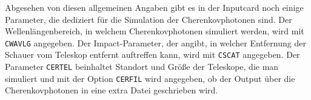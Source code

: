 Abgesehen von diesen allgemeinen Angaben gibt es in der Inputcard noch einige Parameter, die dediziert für die Simulation der Cherenkovphotonen sind.
Der Wellenlängenbereich, in welchem Cherenkovphotonen simuliert werden, wird mit \texttt{CWAVLG} angegeben.
Der Impact-Parameter, der angibt, in welcher Entfernung der Schauer vom Teleskop entfernt auftreffen kann, wird mit \texttt{CSCAT} angegeben.
Der Parameter \texttt{CERTEL} beinhaltet Standort und Größe der Teleskope, die man simuliert und mit der Option \texttt{CERFIL} wird angegeben, ob der Output über die Cherenkovphotonen in eine extra Datei geschrieben wird.


% 
% 
